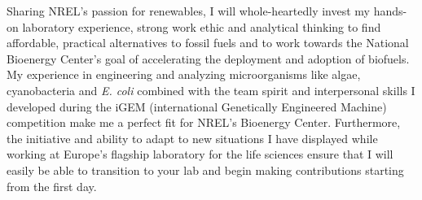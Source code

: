 \documentclass[11pt,a4paper,sans]{moderncv}
\date{\today}
\begin{document}
     
\makelettertitle
\begin{spacing}{1.15}
        



Sharing NREL's passion for renewables, I will whole-heartedly invest my hands-on laboratory experience, strong work ethic and analytical thinking to find affordable, practical alternatives to fossil fuels and to work towards the National Bioenergy Center's goal of accelerating the deployment and adoption of biofuels.
My experience in engineering and analyzing microorganisms like algae, cyanobacteria and \textit{E. coli} combined with the team spirit and interpersonal skills I developed during  the iGEM (international Genetically Engineered Machine) competition make me a perfect fit for NREL's Bioenergy Center. 
Furthermore, the initiative and ability to adapt to new situations I have displayed while working at Europe's flagship laboratory for the life sciences ensure that I will easily be able to transition to your lab and begin making contributions  starting from the first day.


\end{spacing}
\end{document}
